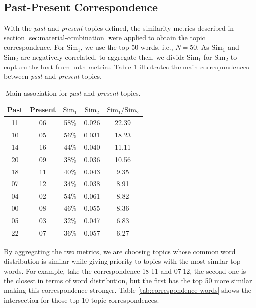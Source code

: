 \subsection{Past-Present Correspondence}

With the \textit{past} and \textit{present} topics defined, the similarity metrics described in section \ref{sec:material-combination} were applied to obtain the topic correspondence. For $\text{Sim}_{1}$, we use the top 50 words, i.e., $N=50$. As $\text{Sim}_{1}$ and $\text{Sim}_{2}$ are negatively correlated, to aggregate then, we divide $\text{Sim}_{1}$ for $\text{Sim}_{2}$ to capture the best from both metrics. Table \ref{tab:correspondence-score} illustrates the main correspondences between \textit{past} and \textit{present} topics.

\begin{table}[h!]
	\centering
	\caption{Main association for \textit{past} and \textit{present} topics.}
	\label{tab:correspondence-score}
	\begin{tabular}{cc|ccc}
		\toprule
		\textbf{Past} & \textbf{Present} & \textbf{$\text{Sim}_{1}$} & \textbf{$\text{Sim}_{2}$} & \textbf{$\text{Sim}_{1} / \text{Sim}_{2}$} \\ \midrule
		 11 &   06 &   58\% &   0.026 &   22.39 \\
		 10 &   05 &   56\% &   0.031 &   18.23 \\
		 14 &   16 &   44\% &   0.040 &   11.11 \\
		 20 &   09 &   38\% &   0.036 &   10.56 \\
		 18 &   11 &   40\% &   0.043 &    9.35 \\
		 07 &   12 &   34\% &   0.038 &    8.91 \\
		 04 &   02 &   54\% &   0.061 &    8.82 \\
		 00 &   08 &   46\% &   0.055 &    8.36 \\
		 05 &   03 &   32\% &   0.047 &    6.83 \\
		 22 &   07 &   36\% &   0.057 &    6.27 \\ \bottomrule
	\end{tabular}
\end{table}

By aggregating the two metrics, we are choosing topics whose common word distribution is similar while giving priority to topics with the most similar top words. For example, take the correspondence 18-11 and 07-12, the second one is the closest in terms of word distribution, but the first has the top 50 more similar making this correspondence stronger. Table \ref{tab:correspondence-words} shows the intersection for those top 10 topic correspondences.

